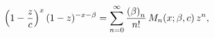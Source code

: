 \[\left(1-\frac{z}{c}\right)^{x}(1-z)^{-x-\beta}=\sum_{n=0}^{\infty}\frac{\left(%
\beta\right)_{n}}{n!}\mathop{M_{n}\/}\nolimits\!\left(x;\beta,c\right)z^{n},\]